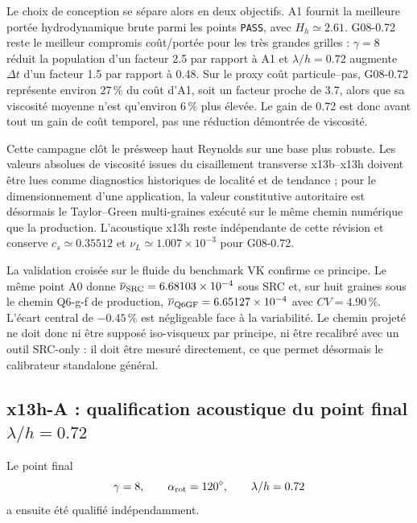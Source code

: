 \documentclass[11pt,a4paper]{article}
\begin{document}
Le choix de conception se sépare alors en deux objectifs. A1 fournit la meilleure portée hydrodynamique brute parmi les points \texttt{PASS}, avec $H_h\simeq2.61$. G08-0.72 reste le meilleur compromis coût/portée pour les très grandes grilles : $\gamma=8$ réduit la population d'un facteur 2.5 par rapport à A1 et $\lambda/h=0.72$ augmente $\Delta t$ d'un facteur 1.5 par rapport à 0.48. Sur le proxy coût particule--pas, G08-0.72 représente environ $27\,\%$ du coût d'A1, soit un facteur proche de 3.7, alors que sa viscosité moyenne n'est qu'environ $6\,\%$ plus élevée. Le gain de 0.72 est donc avant tout un gain de coût temporel, pas une réduction démontrée de viscosité.

Cette campagne clôt le présweep haut Reynolds sur une base plus robuste. Les valeurs absolues de viscosité issues du cisaillement transverse x13b--x13h doivent être lues comme diagnostics historiques de localité et de tendance ; pour le dimensionnement d'une application, la valeur constitutive autoritaire est désormais le Taylor--Green multi-graines exécuté sur le même chemin numérique que la production. L'acoustique x13h reste indépendante de cette révision et conserve $c_s\simeq0.35512$ et $\nu_L\simeq1.007\times10^{-3}$ pour G08-0.72.

La validation croisée sur le fluide du benchmark VK confirme ce principe. Le même point A0 donne $\overline\nu_{\rm SRC}=6.68103\times10^{-4}$ sous SRC et, sur huit graines sous le chemin Q6-g-f de production, $\overline\nu_{\rm Q6GF}=6.65127\times10^{-4}$ avec $CV=4.90\,\%$. L'écart central de $-0.45\,\%$ est négligeable face à la variabilité. Le chemin projeté ne doit donc ni être supposé iso-visqueux par principe, ni être recalibré avec un outil SRC-only : il doit être mesuré directement, ce que permet désormais le calibrateur standalone général.

\subsection{x13h-A : qualification acoustique du point final \texorpdfstring{$\lambda/h=0.72$}{lambda/h=0.72}}

Le point final
\begin{equation}
  \gamma=8,
  \qquad
  \alpha_{\rm rot}=120^\circ,
  \qquad
  \lambda/h=0.72
  \label{eq:x13-final-micro}
\end{equation}
a ensuite été qualifié indépendamment.
\end{document}
